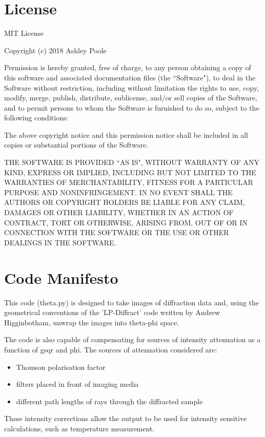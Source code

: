 \documentclass{report}
\begin{document}
\chapter{License}

MIT License

Copyright (c) 2018 Ashley Poole

Permission is hereby granted, free of charge, to any person obtaining a copy
of this software and associated documentation files (the ``Software"), to deal
in the Software without restriction, including without limitation the rights
to use, copy, modify, merge, publish, distribute, sublicense, and/or sell
copies of the Software, and to permit persons to whom the Software is
furnished to do so, subject to the following conditions:

The above copyright notice and this permission notice shall be included in all
copies or substantial portions of the Software.

THE SOFTWARE IS PROVIDED ``AS IS", WITHOUT WARRANTY OF ANY KIND, EXPRESS OR
IMPLIED, INCLUDING BUT NOT LIMITED TO THE WARRANTIES OF MERCHANTABILITY,
FITNESS FOR A PARTICULAR PURPOSE AND NONINFRINGEMENT. IN NO EVENT SHALL THE
AUTHORS OR COPYRIGHT HOLDERS BE LIABLE FOR ANY CLAIM, DAMAGES OR OTHER
LIABILITY, WHETHER IN AN ACTION OF CONTRACT, TORT OR OTHERWISE, ARISING FROM,
OUT OF OR IN CONNECTION WITH THE SOFTWARE OR THE USE OR OTHER DEALINGS IN THE
SOFTWARE.

\chapter{Code Manifesto}

This code (theta.py) is designed to take images of diffraction data and, using the geometrical conventions of the 'LP-Diffract' code written by Andrew Higginbotham, unwrap the images into theta-phi space.

The code is also capable of compensating for sources of intensity attenuation as a function of gsqr and phi. The sources of attenuation considered are:
\begin{itemize}
\item Thomson polarisation factor
\item filters placed in front of imaging media
\item different path lengths of rays through the diffracted sample
\end{itemize} 

These intensity corrections allow the output to be used for intensity sensitive calculations, such as temperature measurement.
\end{document}
